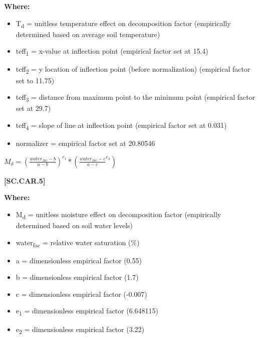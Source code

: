         \textbf{Where:}
            
        \begin{itemize}
            \item T\textsubscript{d} = unitless temperature effect on decomposition factor (empirically determined based on average soil temperature)
            \item teff\textsubscript{1} = x-value at inflection point (empirical factor set at 15.4)
            \item teff\textsubscript{2} = y location of inflection point (before normalization) (empirical factor set to 11.75)
            \item teff\textsubscript{3} = distance from maximum point to the minimum point	 			(empirical factor set at 29.7)
            \item teff\textsubscript{4} = slope of line at inflection point (empirical factor set at 0.031)
            \item normalizer = empirical factor set at 20.80546
        \end{itemize}
        \vspace{0.5cm}


    \begin{center}
\(M_d=(\frac{water_{fac}-b}{a-b})^{e_1} * (\frac{water_{fac}-c}{a-c}^{e_2})	\)
    \end{center}
        \vspace{0.5cm} 
    
            {\raggedleft \textbf{[SC.CAR.5]}\par}
            \vspace{0.5cm}

        \textbf{Where:}
            
        \begin{itemize}
            \item M\textsubscript{d} = unitless moisture effect on decomposition factor (empirically determined based on soil water levels)
            \item water\textsubscript{fac} = relative water saturation (\%)
            \item a = dimensionless empirical factor (0.55)
            \item b = dimensionless empirical factor (1.7)
            \item c = dimensionless empirical factor (-0.007)
            \item e\textsubscript{1} = dimensionless empirical factor (6.648115)
            \item e\textsubscript{2} = dimensionless empirical factor (3.22)
        \end{itemize}
        \vspace{0.5cm}

